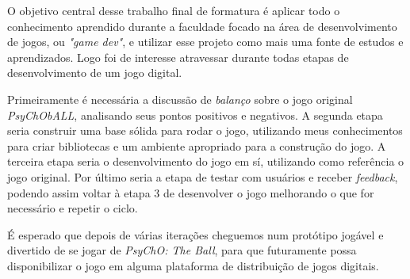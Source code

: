   O objetivo central desse trabalho final de formatura é aplicar todo o conhecimento aprendido durante a faculdade focado na área de desenvolvimento de jogos, ou \textit{"game dev"}, e utilizar esse projeto como mais uma fonte de estudos e aprendizados. Logo foi de interesse atravessar durante todas etapas de desenvolvimento de um jogo digital.

  Primeiramente é necessária a discussão de \textit{balanço} sobre o jogo original \textit{PsyChObALL}, analisando seus pontos positivos e negativos. A segunda etapa seria construir uma base sólida para rodar o jogo, utilizando meus conhecimentos para criar bibliotecas e um ambiente apropriado para a construção do jogo. A terceira etapa seria o desenvolvimento do jogo em sí, utilizando como referência o jogo original. Por último seria a etapa de testar com usuários e receber \textit{feedback}, podendo assim voltar à etapa 3 de desenvolver o jogo melhorando o que for necessário e repetir o ciclo.

  É esperado que depois de várias iterações cheguemos num protótipo jogável e divertido de se jogar de \textit{PsyChO: The Ball}, para que futuramente possa disponibilizar o jogo em alguma plataforma de distribuição de jogos digitais.
